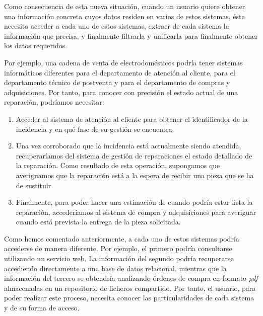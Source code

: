
Como consecuencia de esta nueva situación, cuando un usuario quiere obtener una información concreta cuyos datos residen en varios de estos sistemas, éste necesita acceder a cada uno de estos sistemas, extraer de cada sistema la información que precisa, y finalmente filtrarla y unificarla para finalmente obtener los datos requeridos.

Por ejemplo, una cadena de venta de electrodomésticos podría tener sistemas informáticos diferentes para el departamento de atención al cliente, para el departamento técnico de postventa y para el departamento de compras y adquisiciones. Por tanto, para conocer con precisión el estado actual de una reparación, podríamos necesitar:

\begin{enumerate}
	\item Acceder al sistema de atención al cliente para obtener el identificador de la incidencia y en qué fase de su gestión se encuentra.
	\item Una vez corroborado que la incidencia está actualmente siendo atendida, recuperaríamos del sistema de gestión de reparaciones el estado detallado de la reparación. Como resultado de esta operación, supongamos que averiguamos que la reparación está a la espera de recibir una pieza que se ha de sustituir.
	\item Finalmente, para poder hacer una estimación de cuando podría estar lista la reparación, accederíamos al sistema de compra y adquisiciones para averiguar cuando está prevista la entrega de la pieza solicitada.
\end{enumerate}

Como hemos comentado anteriormente, a cada uno de estos sistemas podría accederse de manera diferente. Por ejemplo, el primero podría consultarse utilizando un servicio web. La información del segundo podría recuperarse accediendo directamente a una base de datos relacional, mientras que la información del tercero se obtendría analizando órdenes de compra en formato \emph{pdf} almacenadas en un repositorio de ficheros compartido. Por tanto, el usuario, para poder realizar este proceso, necesita conocer las particularidades de cada sistema y de su forma de acceso.

